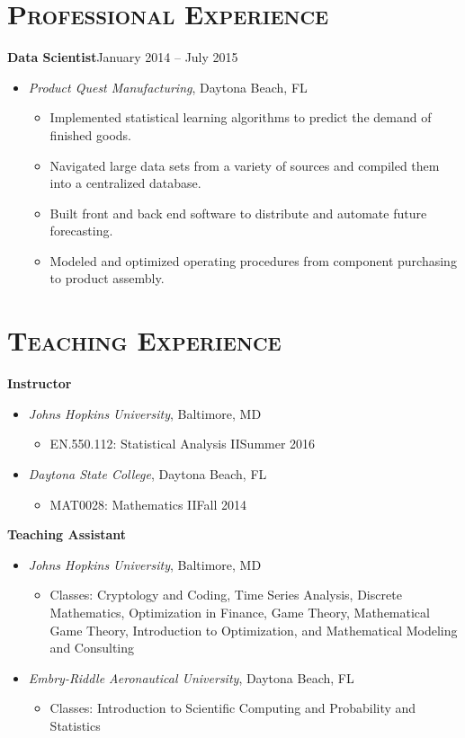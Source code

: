 \documentclass[10pt]{article}
\begin{document}
\section*{\textsc{Professional Experience}}
\textbf{Data Scientist}\hfill January 2014 -- July 2015
\begin{itemize}[noitemsep]
    \item[] \textit{Product Quest Manufacturing}, Daytona Beach, FL
    \begin{itemize}[noitemsep]
        \item Implemented statistical learning algorithms to predict the demand of finished goods.
        \item Navigated large data sets from a variety of sources and compiled them into a centralized database.
        \item Built front and back end software to distribute and automate future forecasting.
        \item Modeled and optimized operating procedures from component purchasing to product assembly.
    \end{itemize}
\end{itemize}

\section*{\textsc{Teaching Experience}}
\textbf{Instructor}
\begin{itemize}[noitemsep]
	\item[] \textit{Johns Hopkins University}, Baltimore, MD
	\begin{itemize}[noitemsep]
		\item EN.550.112: Statistical Analysis II\hfill Summer 2016
	\end{itemize}
	\vspace{2ex}
	\item[] \textit{Daytona State College}, Daytona Beach, FL
    \begin{itemize}[noitemsep]
        \item MAT0028: Mathematics II\hfill Fall 2014
    \end{itemize}
\end{itemize}
\textbf{Teaching Assistant}
\begin{itemize}[noitemsep]
    \item[] \textit{Johns Hopkins University}, Baltimore, MD
    \begin{itemize}[noitemsep]
    		\item[] Classes: Cryptology and Coding, Time Series Analysis, Discrete Mathematics, Optimization in Finance, Game Theory, Mathematical Game Theory, Introduction to Optimization, and Mathematical Modeling and Consulting
    \end{itemize}
    \vspace{2ex}
    \item[] \textit{Embry-Riddle Aeronautical University}, Daytona Beach, FL
    \begin{itemize}[noitemsep]
        \item[] Classes: Introduction to Scientific Computing and Probability and Statistics
    \end{itemize}
\end{itemize}
\end{document}
